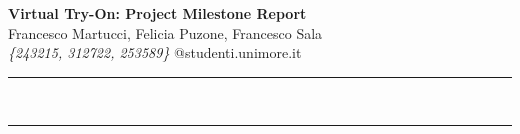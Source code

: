 \documentclass[a4paper,12pt]{article}
\renewenvironment{abstract}
 {\par\noindent\textbf{\abstractname}\ \ignorespaces \\}
 {\par\noindent\medskip}
\begin{document}
\pagestyle{fancy}
\thispagestyle{empty}
\fancyhead[L]{}

\renewcommand*{\thefootnote}{\fnsymbol{footnote}}

\begin{center}
\Large{\textbf{Virtual Try-On: Project Milestone Report}} 
\vspace{0.4cm}
\normalsize
\\ Francesco Martucci, Felicia Puzone, Francesco Sala \\
\vspace{0.1cm}
\textit{\{243215, 312722, 253589\}}
\small{@studenti.unimore.it}
\medskip
\normalsize
\end{center}

{\color{gray}\hrule}
\vspace{0.4cm}
\begin{abstract}

\end{abstract}

{\color{gray}\hrule}
\medskip







\end{document}
